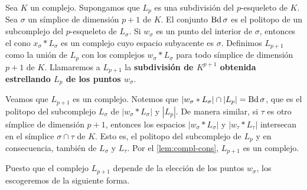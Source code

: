 \begin{definicion}
	Sea $K$ un complejo. Supongamos que $L_p$ es una subdivisión del $p$-esqueleto de $K$. Sea $\sigma$ un símplice de dimensión $p+1$ de $K$. El conjunto $\operatorname{Bd} \sigma$ es el politopo de un subcomplejo del $p$-esqueleto de $L_{\sigma}$. Si $w_{\sigma}$ es un punto del interior de $\sigma$, entonces el cono $x_\sigma \ast L_{\sigma}$ es un complejo cuyo espacio subyacente es $\sigma$. Definimos $L_{p+1}$ como la unión de $L_p$ con los complejos $w_{\sigma} \ast L_{\sigma}$ para todo símplice de dimensión $p+1$ de $K$.
	Llamaremos a $L_{p+1}$ la \textbf{subdivisión de $K^{p+1}$ obtenida estrellando $L_p$ de los puntos $w_{\sigma}$}.
\end{definicion}

Veamos que $L_{p+1}$ es un complejo. Notemos que $|w_{\sigma} \ast L_{\sigma}|\cap|L_p| = \operatorname{Bd} \sigma$, que es el politopo del subcomplejo $L_{\sigma}$ de $|w_{\sigma} \ast L_{\sigma}|$ y $|L_p|$. De manera similar, si $\tau$ es otro símplice de dimensión $p+1$, entonces los espacios $|w_{\sigma} \ast L_{\sigma}|$ y $|w_{\tau} \ast L_{\tau}|$ intersecan en el símplice $\sigma \cap \tau$ de $K$. Esto es, el politopo del subcomplejo de $L_p$ y en consecuencia, también de $L_{\sigma}$ y $L_{\tau}$. Por el \autoref{lem:compl-cons}, $L_{p+1}$ es un complejo.

Puesto que el complejo $L_{p+1}$ depende de la elección de los puntos $w_{\sigma}$, los escogeremos de la siguiente forma.

